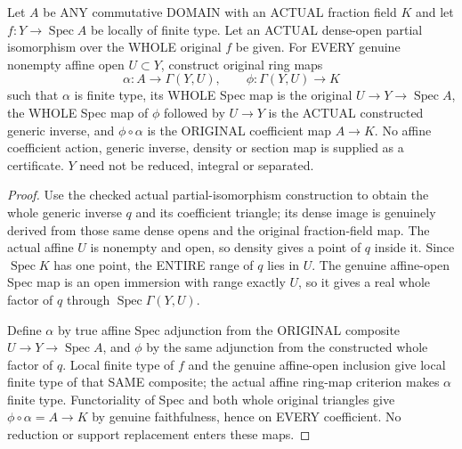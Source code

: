\begin{lemma}
\label{scheme:actual-birational-affine-fraction-evaluation}
\leanok
{}
Let $A$ be ANY commutative DOMAIN with an ACTUAL fraction field $K$ and let
$f:Y\to\operatorname{Spec}A$ be locally of finite type.  Let an ACTUAL
dense-open partial isomorphism over the WHOLE original $f$ be given.  For
EVERY genuine nonempty affine open $U\subset Y$, construct original ring maps
\[
 \alpha:A\to\Gamma(Y,U),\qquad \phi:\Gamma(Y,U)\to K
\]
such that $\alpha$ is finite type, its WHOLE Spec map is the original
$U\to Y\to\operatorname{Spec}A$, the WHOLE Spec map of $\phi$ followed by
$U\to Y$ is the ACTUAL constructed generic inverse, and
$\phi\circ\alpha$ is the ORIGINAL coefficient map $A\to K$.
No affine coefficient action, generic inverse, density or section map is
supplied as a certificate.  $Y$ need not be reduced, integral or separated.
\end{lemma}
\begin{proof}
Use the checked actual partial-isomorphism construction to obtain the whole
generic inverse $q$ and its coefficient triangle; its dense image is genuinely
derived from those same dense opens and the original fraction-field map.
The actual affine $U$ is nonempty and open, so density gives a point of
$q$ inside it.  Since $\operatorname{Spec}K$ has one point, the ENTIRE range
of $q$ lies in $U$.  The genuine affine-open Spec map is an open immersion
with range exactly $U$, so it gives a real whole factor of $q$ through
$\operatorname{Spec}\Gamma(Y,U)$.

Define $\alpha$ by true affine Spec adjunction from the ORIGINAL composite
$U\to Y\to\operatorname{Spec}A$, and $\phi$ by the same adjunction from the
constructed whole factor of $q$.  Local finite type of $f$ and the genuine
affine-open inclusion give local finite type of that SAME composite; the
actual affine ring-map criterion makes $\alpha$ finite type.  Functoriality
of Spec and both whole original triangles give
$\phi\circ\alpha=A\to K$ by genuine faithfulness, hence on EVERY coefficient.
No reduction or support replacement enters these maps.
\end{proof}

